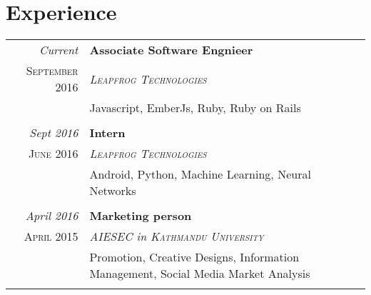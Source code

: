 \documentclass[a4paper,10pt]{article}
\begin{document}
\section{Experience}
\begin{tabular}{r|p{11cm}}
\emph{Current} & \textbf{Associate Software Engnieer}\\ \textsc{September 2016} & \emph{\textsc{Leapfrog Technologies}} \\&\footnotesize{Javascript, EmberJs, Ruby, Ruby on Rails}\\\multicolumn{2}{c}{} \\
 \emph{Sept 2016} & \textbf{Intern}\\ \textsc{June 2016} & \emph{\textsc{Leapfrog Technologies}} \\&\footnotesize{Android, Python, Machine Learning, Neural Networks}\\\multicolumn{2}{c}{} \\
 \emph{April 2016} & \textbf{Marketing person}\\ \textsc{April 2015} & \emph{\textsc{AIESEC} in \textsc{Kathmandu University}} \\&\footnotesize{Promotion, Creative Designs, Information Management, Social Media Market Analysis}\\\multicolumn{2}{c}{} \\
\end{tabular}
\end{document}
